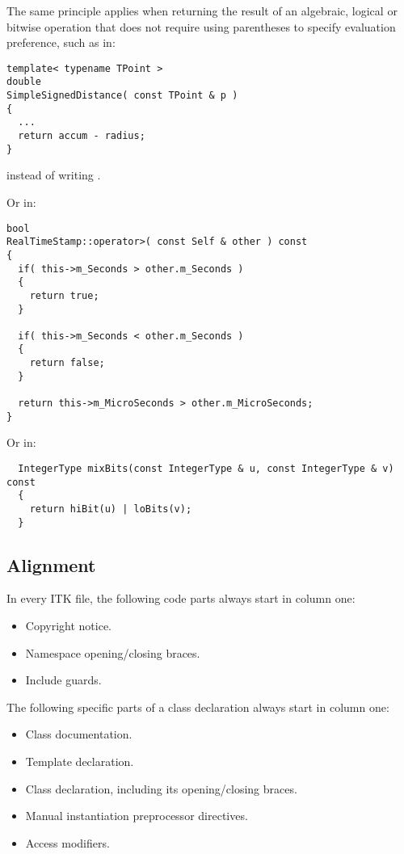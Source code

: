 The same principle applies when returning the result of an algebraic, logical or
bitwise operation that does not require using parentheses to specify
evaluation preference, such as in:

\small
\begin{verbatim}
template< typename TPoint >
double
SimpleSignedDistance( const TPoint & p )
{
  ...
  return accum - radius;
}
\end{verbatim}
\normalsize

instead of writing .

Or in:

\small
\begin{verbatim}
bool
RealTimeStamp::operator>( const Self & other ) const
{
  if( this->m_Seconds > other.m_Seconds )
  {
    return true;
  }

  if( this->m_Seconds < other.m_Seconds )
  {
    return false;
  }

  return this->m_MicroSeconds > other.m_MicroSeconds;
}
\end{verbatim}
\normalsize

Or in:

\small
\begin{verbatim}
  IntegerType mixBits(const IntegerType & u, const IntegerType & v) const
  {
    return hiBit(u) | loBits(v);
  }
\end{verbatim}
\normalsize


\subsection{Alignment}
\label{subsec:Alignment}

In every ITK file, the following code parts always start in column one:
\begin{itemize}
\item Copyright notice.
\item Namespace opening/closing braces.
\item Include guards.
\end{itemize}

The following specific parts of a class declaration always start in column one:
\begin{itemize}
\item Class documentation.
\item Template declaration.
\item Class declaration, including its opening/closing braces.
\item Manual instantiation preprocessor directives.
\item Access modifiers.
\end{itemize}

